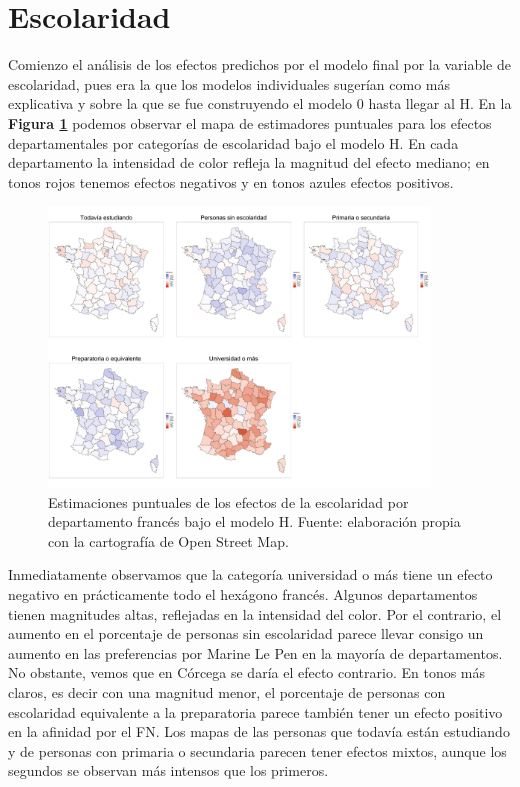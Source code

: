\section{Escolaridad}

Comienzo el análisis de los efectos predichos por el modelo final por la variable de escolaridad, pues era la que los modelos individuales sugerían como más explicativa y sobre la que se fue construyendo el modelo 0 hasta llegar al H. En la \textbf{Figura \ref{fig:Mapa_Efectos_Escolaridad}} podemos observar el mapa de estimadores puntuales para los efectos departamentales por categorías de escolaridad bajo el modelo H. En cada departamento la intensidad de color refleja la magnitud del efecto mediano; en tonos rojos tenemos efectos negativos y en tonos azules efectos positivos.\\

\begin{figure}
	\centering
	\includegraphics[width = 0.9\textwidth]{Figs/Efectos/Mapa_Efectos_Escolaridad_Modelo_H}
	\caption{Estimaciones puntuales de los efectos de la escolaridad por departamento francés bajo el modelo H. Fuente: elaboración propia con la cartografía de Open Street Map.}
	\label{fig:Mapa_Efectos_Escolaridad}
\end{figure}

Inmediatamente observamos que la categoría universidad o más tiene un efecto negativo en prácticamente todo el hexágono francés. Algunos departamentos tienen magnitudes altas, reflejadas en la intensidad del color. Por el contrario, el aumento en el porcentaje de personas sin escolaridad parece llevar consigo un aumento en las preferencias por Marine Le Pen en la mayoría de departamentos. No obstante, vemos que en Córcega se daría el efecto contrario. En tonos más claros, es decir con una magnitud menor, el porcentaje de personas con escolaridad equivalente a la preparatoria parece también tener un efecto positivo en la afinidad por el FN. Los mapas de las personas que todavía están estudiando y de personas con primaria o secundaria parecen tener efectos mixtos, aunque los segundos se observan más intensos que los primeros.\\


